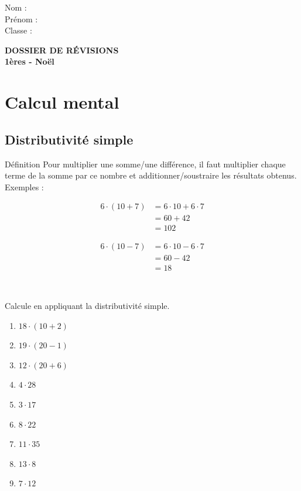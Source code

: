 \documentclass[10pt,a4paper]{article}
\begin{document}
Nom : \\
Prénom : \\ 
Classe : \\

\vspace{2cm}

\begin{center}
	\Huge{\textbf{DOSSIER DE RÉVISIONS}}\\
	\huge{\textbf{1ères - Noël}}
\end{center}
	
\normalsize
	\section{Calcul mental}
		\subsection{Distributivité simple}	
			\begin{bclogo}[arrondi=0.3, logo=\bccle]{Définition}
				Pour multiplier une somme/une différence, il faut multiplier chaque terme de la somme par ce nombre et additionner/soustraire les résultats obtenus.\\
				Exemples : 
				\parbox[t]{0.3\textwidth}{
					\begin{align*}
						6\cdot (10+7) &= 6\cdot 10 + 6\cdot 7\\
						& = 60 + 42\\
						& = 102
					\end{align*}}
				\parbox[t]{0.3\textwidth}{
					\begin{align*}
						6\cdot (10-7) &= 6\cdot 10 - 6\cdot 7\\
						& = 60 - 42\\
						& = 18
					\end{align*}}\\
			\end{bclogo}

\begin{exercise}
Calcule en appliquant la distributivité simple.
	\begin{enumerate}[cols=3]
		\item $18\cdot (10+2)$
		\item $19\cdot (20-1)$
		\item $12\cdot (20+6)$
		\item $4\cdot 28$
		\item $3\cdot 17$
		\item $8\cdot 22$
		\item $11\cdot 35$
		\item $13\cdot 8$
		\item $7\cdot 12$
	\end{enumerate}
\end{exercise}
\end{document}
